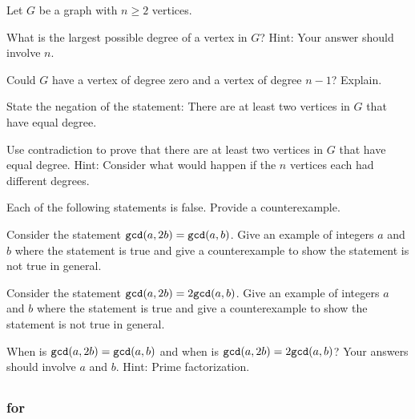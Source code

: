 \begin{exer}[\exerE] %
\label{exer_irregular_graphs}
    Let $G$ be a graph with $n \ge 2$ vertices.
    \begin{apart}
        \item What is the largest possible degree of a vertex in $G$?  Hint: Your answer should involve $n$.
        \item Could $G$ have a vertex of degree zero and a vertex of degree $n-1$? Explain. 
        \item State the negation of the statement: There are at least two vertices in $G$ that have equal degree.
        \item Use contradiction to prove that there are at least two vertices in $G$ that have equal degree.  Hint: Consider what would happen if the $n$ vertices each had different degrees.
    \end{apart}
\end{exer}

\begin{exer}[\exerE] %
\label{exer_cex_gcd}
    Each of the following statements is false.  Provide a counterexample.
        \begin{exerpart} 
            \item Consider the statement $\texttt{gcd}(a,2b) = \texttt{gcd}(a,b)$.  Give an example of integers $a$ and $b$ where the statement is true and give a counterexample to show the statement is not true in general.
            \item Consider the statement $\texttt{gcd}(a,2b) = 2\texttt{gcd}(a,b)$.  Give an example of integers $a$ and $b$ where the statement is true and give a counterexample to show the statement is not true in general.
            \item When is $\texttt{gcd}(a,2b) = \texttt{gcd}(a,b)$ and when is $\texttt{gcd}(a,2b) = 2\texttt{gcd}(a,b)$?  Your answers should involve $a$ and $b$.  Hint: Prime factorization.
        \end{exerpart}
\end{exer}

\subsection{\answers}

\subsubsection{\answers for  \subquant}

